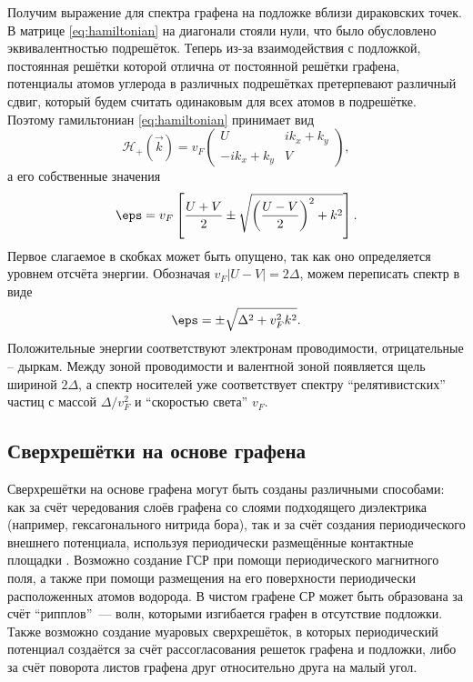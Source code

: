 Получим выражение для спектра графена на подложке вблизи дираковских точек. В матрице \eqref{eq:hamiltonian} на диагонали стояли нули, что было обусловлено эквивалентностью подрешёток. Теперь из-за взаимодействия с подложкой, постоянная решётки которой отлична от постоянной решётки графена, потенциалы атомов углерода в различных подрешётках претерпевают различный сдвиг, который будем считать одинаковым для всех атомов в подрешётке. Поэтому гамильтониан \eqref{eq:hamiltonian} принимает вид
\begin{equation*}
      \mathcal{H}_+(\vec{k}) = 
      v_F
    \begin{pmatrix}
        U & ik_x + k_y\\
        -ik_x + k_y & V
    \end{pmatrix},
\end{equation*}
а его собственные значения
\begin{equation*}
  \eps = v_F\left[ \frac{U+V}{2} \pm \sqrt{\left(\frac{U-V}{2}\right)^2+k^2} \right].
\end{equation*}
Первое слагаемое в скобках может быть опущено, так как оно определяется уровнем отсчёта энергии. Обозначая \( v_F|U-V| = 2\Delta \), можем переписать спектр в виде
\begin{equation*}
  \eps = \pm\sqrt{\Delta^2 + v_F^2k^2}.
\end{equation*}
Положительные энергии соответствуют электронам проводимости, отрицательные -- дыркам. Между зоной проводимости и валентной зоной появляется щель шириной \( 2\Delta \), а спектр носителей уже соответствует спектру ``релятивистских'' частиц с массой \( \Delta / v_F^2 \) и ``скоростью света'' \( v_F \).

\subsection{Сверхрешётки на основе графена}
Сверхрешётки на основе графена могут быть созданы различными способами: как за счёт чередования слоёв графена со слоями подходящего диэлектрика (например, гексагонального нитрида бора), так и за счёт создания периодического внешнего потенциала, используя периодически размещённые контактные площадки \cite{olbrich}. Возможно создание ГСР при помощи периодического магнитного поля, а также при помощи размещения на его поверхности периодически расположенных атомов водорода. В чистом графене СР может быть образована за счёт ``рипплов''~--- волн, которыми изгибается графен в отсутствие подложки. Также возможно создание муаровых сверхрешёток, в которых периодический потенциал создаётся за счёт рассогласования решеток графена и подложки, либо за счёт поворота листов графена друг относительно друга на малый угол.

